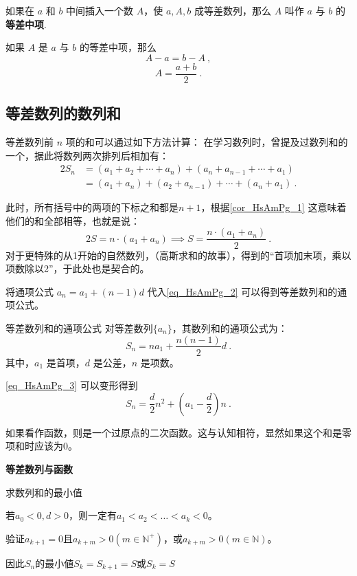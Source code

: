 如果在 $a$ 和 $b$ 中间插入一个数 $A$，使 $a,A,b$ 成等差数列，那么 $A$ 叫作 $a$ 与 $b$ 的\textbf{等差中项}.

如果 $A$ 是 $a$ 与 $b$ 的等差中项，那么
\begin{equation}
A - a = b - A~,
\end{equation}
\begin{equation}
A = \frac{a+b}{2}~.
\end{equation}


\subsection{等差数列的数列和}

等差数列前 $n$ 项的和可以通过如下方法计算：  
在学习数列时，曾提及过数列和的一个，据此将数列两次排列后相加有：
\begin{equation}
\begin{split}
2S_n &= (a_1 + a_2 + \cdots + a_n)+(a_n + a_{n-1} + \cdots + a_1)\\
&=(a_1+a_{n})+(a_2+a_{n-1}) +\cdots +(a_n+a_1)~.
\end{split}
\end{equation}

此时，所有括号中的两项的下标之和都是$n+1$，根据\autoref{cor_HsAmPg_1} 这意味着他们的和全部相等，也就是说：
\begin{equation}\label{eq_HsAmPg_2}
2S = n \cdot (a_1+a_n)\implies S = \frac{n\cdot(a_1+a_n)}{2}~.
\end{equation}
对于更特殊的从1开始的自然数列，（高斯求和的故事），得到的“首项加末项，乘以项数除以2”，于此处也是契合的。

将通项公式 $a_n = a_1 + (n-1)d$ 代入\autoref{eq_HsAmPg_2} 可以得到等差数列和的通项公式。
\begin{corollary}{等差数列和的通项公式}
对等差数列$\{a_n\}$，其数列和的通项公式为：
\begin{equation}\label{eq_HsAmPg_3}
S_n = na_1+\frac{n(n-1)}{2}d~.
\end{equation}
其中，$a_1$ 是首项，$d$ 是公差，$n$ 是项数。
\end{corollary}

\autoref{eq_HsAmPg_3} 可以变形得到
\begin{equation}
S_n = \frac{d}{2}n^2+\left(a_1-\frac{d}{2}\right)n~.
\end{equation}

如果看作函数，则是一个过原点的二次函数。这与认知相符，显然如果这个和是零项和时应该为$0$。


\textbf{等差数列与函数}

求数列和的最小值

若$a_0<0,d>0$，则一定有$a_1<a_2<\dots<a_{k}<0$。

验证$a_{k+1} =0$且$a_{k+m}>0(m\in\mathbb{N}^+)$，或$a_{k+m}>0(m\in\mathbb{N})$。

因此$S_n$的最小値$S_k=S_{k+1}=S$或$S_k=S$